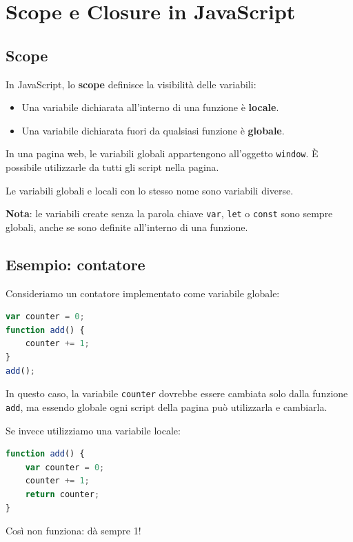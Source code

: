 \chapter{Scope e Closure in JavaScript}

\section{Scope}

In JavaScript, lo \textbf{scope} definisce la visibilità delle variabili:
\begin{itemize}
    \item Una variabile dichiarata all'interno di una funzione è \textbf{locale}.
    \item Una variabile dichiarata fuori da qualsiasi funzione è \textbf{globale}.
\end{itemize}

In una pagina web, le variabili globali appartengono all'oggetto \texttt{window}. È possibile utilizzarle da tutti gli script nella pagina.

Le variabili globali e locali con lo stesso nome sono variabili diverse.

\textbf{Nota}: le variabili create senza la parola chiave \texttt{var}, \texttt{let} o \texttt{const} sono sempre globali, anche se sono definite all'interno di una funzione.

\section{Esempio: contatore}

Consideriamo un contatore implementato come variabile globale:

\begin{lstlisting}[language=JavaScript]
var counter = 0;
function add() {
    counter += 1;
}
add();
\end{lstlisting}

In questo caso, la variabile \texttt{counter} dovrebbe essere cambiata solo dalla funzione \texttt{add}, ma essendo globale ogni script della pagina può utilizzarla e cambiarla.

Se invece utilizziamo una variabile locale:

\begin{lstlisting}[language=JavaScript]
function add() {
    var counter = 0;
    counter += 1;
    return counter;
}
\end{lstlisting}

Così non funziona: dà sempre 1!


